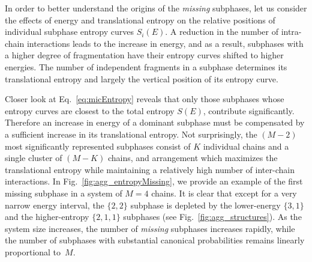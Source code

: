 \documentclass[12pt]{report}
\begin{document}
\newpage
%
In order to better understand the origins of the \textit{missing} subphases, let us consider the effects of energy and translational entropy on the relative positions of individual subphase entropy curves $S_{i}(E)$. A reduction in the number of intra-chain interactions leads to the increase in energy, and as a result, subphases with a higher degree of fragmentation have their entropy curves shifted to higher energies. The number of independent fragments in a subphase determines its translational entropy and largely the vertical position of its entropy curve. 
%

%
Closer look at Eq.~\eqref{eq:micEntropy} reveals that only those subphases whose entropy curves are closest to the total entropy $S(E)$, contribute significantly. Therefore an increase in energy of a dominant subphase must be compensated by a sufficient increase in its translational entropy. Not surprisingly, the $(M-2)$ most significantly represented subphases consist of $K$ individual chains and a single cluster of $(M - K)$ chains, and arrangement which maximizes the translational entropy while maintaining a relatively high number of inter-chain interactions. 
\newpage
\noindent
In Fig.~\ref{fig:agg_entropyMissing}, we provide an example of the first missing subphase in a system of $M=4$ chains. It is clear that except for a very narrow energy interval, the $\{2,2\}$ subphase is depleted by the lower-energy $\{3,1\}$ and the higher-entropy $\{2,1,1\}$ subphases (see Fig.~\ref{fig:agg_structures}). As the system size increases, the number of \textit{missing} subphases increases rapidly, while the number of subphases with substantial canonical probabilities remains linearly proportional to~$M$. 
%

\end{document}
